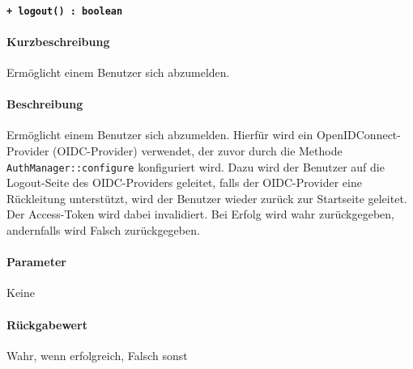 \paragraph{\texttt{+ logout() : boolean}}%
\paragraph*{Kurzbeschreibung}
Ermöglicht einem Benutzer sich abzumelden.
\paragraph*{Beschreibung}
Ermöglicht einem Benutzer sich abzumelden.
Hierfür wird ein OpenIDConnect-Provider (OIDC-Provider) verwendet, der zuvor durch die Methode \verb#AuthManager::configure# konfiguriert wird.
Dazu wird der Benutzer auf die Logout-Seite des OIDC-Providers geleitet, falls der OIDC-Provider eine Rückleitung unterstützt, wird der Benutzer wieder zurück zur Startseite geleitet.
Der Access-Token wird dabei invalidiert.
Bei Erfolg wird wahr zurückgegeben, andernfalls wird Falsch zurückgegeben.
\paragraph*{Parameter}
Keine
\paragraph*{Rückgabewert}
Wahr, wenn erfolgreich, Falsch sonst
